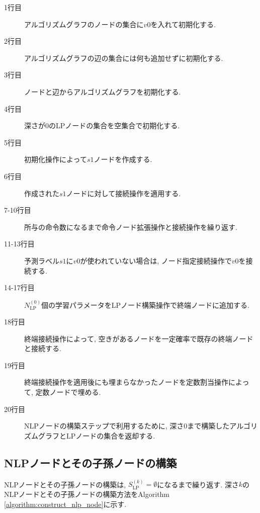 \documentclass[11pt,oneside,openany,report]{jsbook}
\begin{document}
\begin{description}
  \item[1行目] アルゴリズムグラフのノードの集合に$v0$を入れて初期化する.
  \item[2行目] アルゴリズムグラフの辺の集合には何も追加せずに初期化する.
  \item[3行目] ノードと辺からアルゴリズムグラフを初期化する.
  \item[4行目] 深さが0のLPノードの集合を空集合で初期化する.
  \item[5行目] 初期化操作によって$s1$ノードを作成する.
  \item[6行目] 作成された$s1$ノードに対して接続操作を適用する.
  \item[7-10行目] 所与の命令数になるまで命令ノード拡張操作と接続操作を繰り返す.
  \item[11-13行目] 予測ラベル$s1$に$v0$が使われていない場合は, ノード指定接続操作で$v0$を接続する.
  \item[14-17行目] $N_\mathrm{LP}^{(0)}$個の学習パラメータをLPノード構築操作で終端ノードに追加する.
  \item[18行目] 終端接続操作によって, 空きがあるノードを一定確率で既存の終端ノードと接続する.
  \item[19行目] 終端接続操作を適用後にも埋まらなかったノードを定数割当操作によって, 定数ノードで埋める.
  \item[20行目] NLPノードの構築ステップで利用するために, 深さ$0$まで構築したアルゴリズムグラフとLPノードの集合を返却する.
\end{description}

\subsection{NLPノードとその子孫ノードの構築} \label{subsec:proposed:initialization:nlp}

NLPノードとその子孫ノードの構築は, $S_\mathrm{LP}^{(k)} = \emptyset$になるまで繰り返す. 深さ$k$のNLPノードとその子孫ノードの構築方法をAlgorithm \ref{algorithm:construct_nlp_node}に示す.
\end{document}
